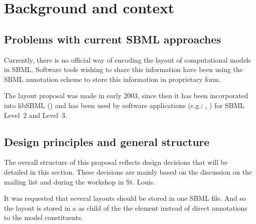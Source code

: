 \section{Background and context}
\label{background}
\subsection{Problems with current SBML approaches}
Currently, there is no official way of encoding the layout of computational models in SBML. Software tools wishing to share this information have been using the SBML annotation scheme to store this information in proprietary form. 

The layout proposal was made in early 2003, since then it has been incorporated into libSBML (\cite{Gauges01082006}) and has been used by software applications (e.g.: \cite{COPASI}, \cite{sbw}) for SBML Level~2 and Level~3. 


\subsection{Design principles and general structure}

The overall structure of this proposal reflects design decisions that will be detailed in this section. These decisions are mainly based on the discussion on the mailing list and during the workshop in St. Louis.
 
It was requested that several layouts should be stored in one SBML file. And so the layout is stored in a \ListOfLayouts as child of the the \Model element instead of direct annotations to the model constituents.

